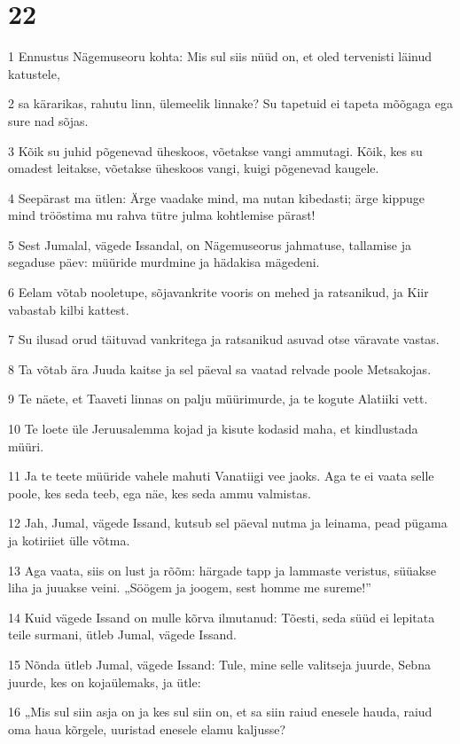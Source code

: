 \chapter{22}

\par 1 Ennustus Nägemuseoru kohta: Mis sul siis nüüd on, et oled tervenisti läinud katustele,
\par 2 sa kärarikas, rahutu linn, ülemeelik linnake? Su tapetuid ei tapeta mõõgaga ega sure nad sõjas.
\par 3 Kõik su juhid põgenevad üheskoos, võetakse vangi ammutagi. Kõik, kes su omadest leitakse, võetakse üheskoos vangi, kuigi põgenevad kaugele.
\par 4 Seepärast ma ütlen: Ärge vaadake mind, ma nutan kibedasti; ärge kippuge mind trööstima mu rahva tütre julma kohtlemise pärast!
\par 5 Sest Jumalal, vägede Issandal, on Nägemuseorus jahmatuse, tallamise ja segaduse päev: müüride murdmine ja hädakisa mägedeni.
\par 6 Eelam võtab nooletupe, sõjavankrite vooris on mehed ja ratsanikud, ja Kiir vabastab kilbi kattest.
\par 7 Su ilusad orud täituvad vankritega ja ratsanikud asuvad otse väravate vastas.
\par 8 Ta võtab ära Juuda kaitse ja sel päeval sa vaatad relvade poole Metsakojas.
\par 9 Te näete, et Taaveti linnas on palju müürimurde, ja te kogute Alatiiki vett.
\par 10 Te loete üle Jeruusalemma kojad ja kisute kodasid maha, et kindlustada müüri.
\par 11 Ja te teete müüride vahele mahuti Vanatiigi vee jaoks. Aga te ei vaata selle poole, kes seda teeb, ega näe, kes seda ammu valmistas.
\par 12 Jah, Jumal, vägede Issand, kutsub sel päeval nutma ja leinama, pead pügama ja kotiriiet ülle võtma.
\par 13 Aga vaata, siis on lust ja rõõm: härgade tapp ja lammaste veristus, süüakse liha ja juuakse veini. „Söögem ja joogem, sest homme me sureme!”
\par 14 Kuid vägede Issand on mulle kõrva ilmutanud: Tõesti, seda süüd ei lepitata teile surmani, ütleb Jumal, vägede Issand.
\par 15 Nõnda ütleb Jumal, vägede Issand: Tule, mine selle valitseja juurde, Sebna juurde, kes on kojaülemaks, ja ütle:
\par 16 „Mis sul siin asja on ja kes sul siin on, et sa siin raiud enesele hauda, raiud oma haua kõrgele, uuristad enesele elamu kaljusse?
